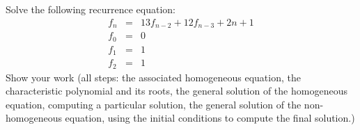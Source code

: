 \documentclass{article}
\begin{document}
\begin{problem}
Solve the following recurrence equation:
%
\begin{eqnarray*}
        f_n &=& 13f_{n-2} + 12f_{n-3} + 2n+1\\
        f_0 &=& 0 \\
        f_1 &=& 1 \\
		f_2 &=& 1
\end{eqnarray*}
%
Show your work (all steps: the associated homogeneous equation,
the characteristic polynomial and its
roots, the general solution of the homogeneous
equation, computing a particular solution,
the general solution of the non-homogeneous equation,
using the initial conditions to compute the final solution.)
\end{problem}
\end{document}
